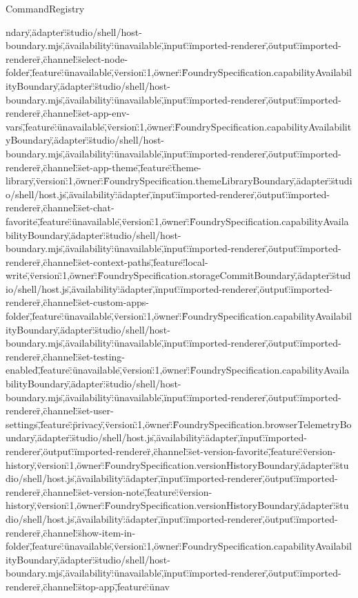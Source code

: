 \begin{lexlean}{CommandRegistry}
\begin{semanticmodule}
{ndary\",\"adapter\":\"studio/shell/host-boundary.mjs\",\"availability\":\"unavailable\",\"input\":\"imported-renderer\",\"output\":\"imported-renderer\"},{\"channel\":\"select-node-folder\",\"feature\":\"unavailable\",\"version\":1,\"owner\":\"FoundrySpecification.capabilityAvailabilityBoundary\",\"adapter\":\"studio/shell/host-boundary.mjs\",\"availability\":\"unavailable\",\"input\":\"imported-renderer\",\"output\":\"imported-renderer\"},{\"channel\":\"set-app-env-vars\",\"feature\":\"unavailable\",\"version\":1,\"owner\":\"FoundrySpecification.capabilityAvailabilityBoundary\",\"adapter\":\"studio/shell/host-boundary.mjs\",\"availability\":\"unavailable\",\"input\":\"imported-renderer\",\"output\":\"imported-renderer\"},{\"channel\":\"set-app-theme\",\"feature\":\"theme-library\",\"version\":1,\"owner\":\"FoundrySpecification.themeLibraryBoundary\",\"adapter\":\"studio/shell/host.js\",\"availability\":\"adapter\",\"input\":\"imported-renderer\",\"output\":\"imported-renderer\"},{\"channel\":\"set-chat-favorite\",\"feature\":\"unavailable\",\"version\":1,\"owner\":\"FoundrySpecification.capabilityAvailabilityBoundary\",\"adapter\":\"studio/shell/host-boundary.mjs\",\"availability\":\"unavailable\",\"input\":\"imported-renderer\",\"output\":\"imported-renderer\"},{\"channel\":\"set-context-paths\",\"feature\":\"local-write\",\"version\":1,\"owner\":\"FoundrySpecification.storageCommitBoundary\",\"adapter\":\"studio/shell/host.js\",\"availability\":\"adapter\",\"input\":\"imported-renderer\",\"output\":\"imported-renderer\"},{\"channel\":\"set-custom-apps-folder\",\"feature\":\"unavailable\",\"version\":1,\"owner\":\"FoundrySpecification.capabilityAvailabilityBoundary\",\"adapter\":\"studio/shell/host-boundary.mjs\",\"availability\":\"unavailable\",\"input\":\"imported-renderer\",\"output\":\"imported-renderer\"},{\"channel\":\"set-testing-enabled\",\"feature\":\"unavailable\",\"version\":1,\"owner\":\"FoundrySpecification.capabilityAvailabilityBoundary\",\"adapter\":\"studio/shell/host-boundary.mjs\",\"availability\":\"unavailable\",\"input\":\"imported-renderer\",\"output\":\"imported-renderer\"},{\"channel\":\"set-user-settings\",\"feature\":\"privacy\",\"version\":1,\"owner\":\"FoundrySpecification.browserTelemetryBoundary\",\"adapter\":\"studio/shell/host.js\",\"availability\":\"adapter\",\"input\":\"imported-renderer\",\"output\":\"imported-renderer\"},{\"channel\":\"set-version-favorite\",\"feature\":\"version-history\",\"version\":1,\"owner\":\"FoundrySpecification.versionHistoryBoundary\",\"adapter\":\"studio/shell/host.js\",\"availability\":\"adapter\",\"input\":\"imported-renderer\",\"output\":\"imported-renderer\"},{\"channel\":\"set-version-note\",\"feature\":\"version-history\",\"version\":1,\"owner\":\"FoundrySpecification.versionHistoryBoundary\",\"adapter\":\"studio/shell/host.js\",\"availability\":\"adapter\",\"input\":\"imported-renderer\",\"output\":\"imported-renderer\"},{\"channel\":\"show-item-in-folder\",\"feature\":\"unavailable\",\"version\":1,\"owner\":\"FoundrySpecification.capabilityAvailabilityBoundary\",\"adapter\":\"studio/shell/host-boundary.mjs\",\"availability\":\"unavailable\",\"input\":\"imported-renderer\",\"output\":\"imported-renderer\"},{\"channel\":\"stop-app\",\"feature\":\"unav}
\end{semanticmodule}
\end{lexlean}
